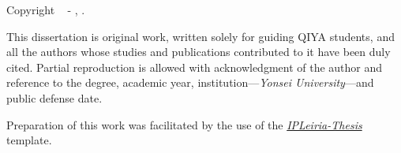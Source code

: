 
\vspace*{\fill}

    
    
    

    
    



\noindent \textbf{\GetTitle}

\noindent Copyright \textcopyright~\the\year{} - \GetFirstAuthor, \GetSchool.

\vspace{.575em}


\noindent This dissertation is original work, written solely for guiding QIYA students, and all the authors whose studies and publications contributed to it have been duly cited. Partial reproduction is allowed with acknowledgment of the author and reference to the degree, academic year, institution---\textit{Yonsei University}---and public defense date.

\vspace{1.395em}


\begin{center}
\end{center}


\vspace{.935em}

\noindent Preparation of this work was facilitated by the use of the \href{https://github.com/joseareia/ipleiria-thesis}{\textit{IPLeiria-Thesis}} template.

\vspace*{\fill}
\MediaOptionLogic